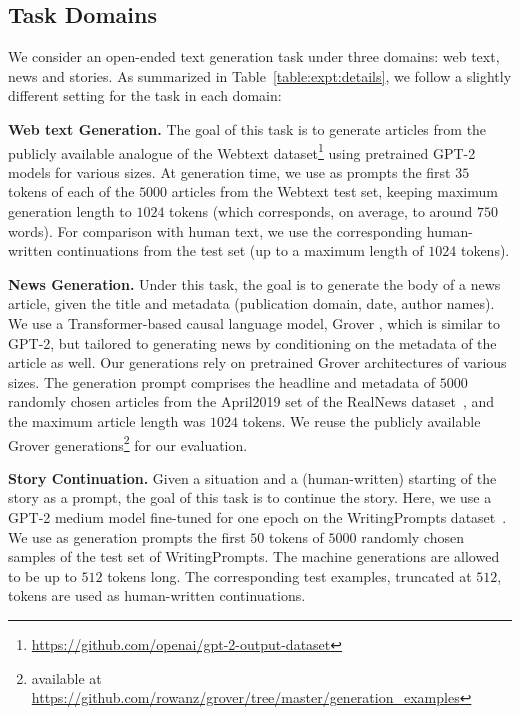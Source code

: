 \documentclass{article}
\newcommand{\myparagraph}[1]{\par\noindent\textbf{{#1}.}} %
\theoremstyle{definition}
\begin{document}
%
%
%
%
%

\subsection{Task Domains} 
\label{sec:supp:domains}

We consider an open-ended text generation task under three domains: web text, news and stories.
As summarized in Table~\ref{table:expt:details}, we follow a slightly different setting for the task in each domain:

\myparagraph{Web text Generation}
The goal of this task is to generate articles from the publicly available analogue of the Webtext dataset\footnote{
\url{https://github.com/openai/gpt-2-output-dataset}
} 
using pretrained GPT-2 models for various sizes.
At generation time, we use as prompts the first $35$ tokens of each of the $5000$ articles from the Webtext test set, keeping maximum generation length to $1024$ tokens (which corresponds, on average, to around $750$ words).
For comparison with human text, we use the corresponding human-written continuations from the test set (up to a maximum length of $1024$ tokens).
%

\myparagraph{News Generation}
Under this task, the goal is to generate the body of a news article, given the title and metadata (publication domain, date, author names).
We use a Transformer-based \cite{vaswani2017attention} causal language model, Grover \cite{zellers2019grover}, which is similar to GPT-2, but tailored to generating news by conditioning on the metadata of the article as well. 
Our generations rely on pretrained Grover architectures of various sizes.
The generation prompt comprises the headline and metadata of $5000$ randomly chosen articles from the April2019 set 
of the RealNews dataset~\cite{zellers2019grover}, and the maximum article length was $1024$ tokens.
We reuse the publicly available Grover generations\footnote{
available at \url{https://github.com/rowanz/grover/tree/master/generation_examples}
} for our evaluation.

\myparagraph{Story Continuation}
Given a situation and a (human-written) starting of the story as a prompt,
the goal of this task is to continue the story. Here, we use a GPT-2 medium model fine-tuned for one epoch on the WritingPrompts dataset~\cite{fan2018heirarchical}. 
We use as generation prompts the first $50$ tokens of $5000$ randomly chosen samples of the test set of WritingPrompts.
The machine generations are allowed to be up to $512$ tokens long. The 
corresponding test examples, truncated at $512$, tokens are used as human-written continuations.
\end{document}

